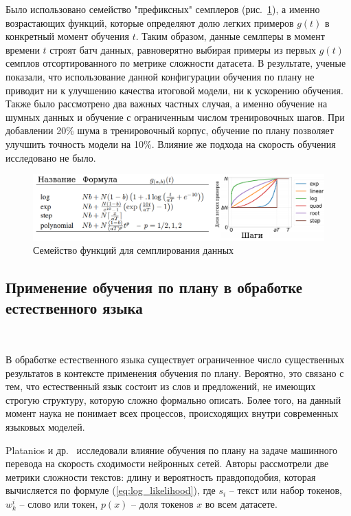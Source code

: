 \documentclass{spbau-diploma}
\begin{document}
Было использовано семейство "префиксных" семплеров (рис.~\ref{fig:cv_pacing_functions}), а именно возрастающих функций, которые определяют долю легких примеров $g(t)$ в конкретный момент обучения $t$. Таким образом, данные семлперы в момент времени $t$ строят батч данных, равноверятно выбирая примеры из первых $g(t)$ семплов отсортированного по метрике сложности датасета. В результате, ученые показали, что использование данной конфигурации обучения по плану не приводит ни к улучшению качества итоговой модели, ни к ускорению обучения. Также было рассмотрено два важных частных случая, а именно обучение на шумных данных и обучение с ограниченным числом тренировочных шагов. При добавлении 20\% шума в тренировочный корпус, обучение по плану позволяет улучшить точность модели на 10\%. Влияние же подхода на скорость обучения исследовано не было.

\begin{figure}[h]
	\centering
	\includegraphics[scale=0.48]{CV_pacing_functions}
	\caption{Семейство функций для семплирования данных}
	\label{fig:cv_pacing_functions}
\end{figure}

\subsection{Применение обучения по плану в обработке естественного языка}
\ 

В обработке естественного языка существует ограниченное число существенных результатов в контексте применения обучения по плану. Вероятно, это связано с тем, что естественный язык состоит из слов и предложений, не имеющих строгую структуру, которую сложно формально описать. Более того, на данный момент наука не понимает всех процессов, происходящих внутри современных языковых моделей.

Platanios и др.~\cite{platanios2019competence} исследовали влияние обучения по плану на задаче машинного перевода на скорость сходимости нейронных сетей. Авторы рассмотрели две метрики сложности текстов: длину и вероятность правдоподобия, которая вычисляется по формуле (\ref{eq:log_likelihood}), где $s_i$ -- текст или набор токенов, $w_k^i$ -- слово или токен, $p(x)$ -- доля токенов $x$ во всем датасете.
\end{document}

